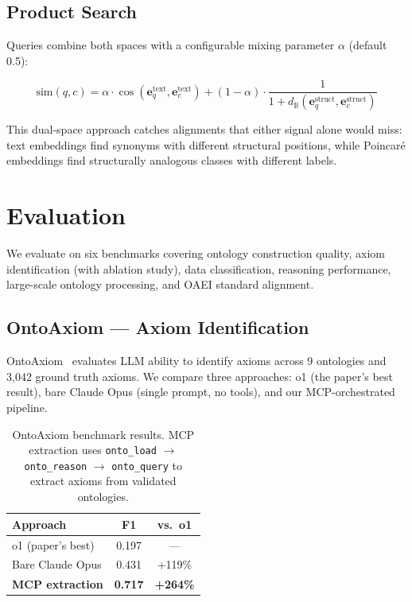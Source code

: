 \documentclass[runningheads]{llncs}
\begin{document}
\subsection{Product Search}

Queries combine both spaces with a configurable mixing parameter $\alpha$ (default 0.5):

\begin{equation}
\text{sim}(q, c) = \alpha \cdot \cos(\mathbf{e}_q^{\text{text}}, \mathbf{e}_c^{\text{text}}) + (1 - \alpha) \cdot \frac{1}{1 + d_{\mathbb{B}}(\mathbf{e}_q^{\text{struct}}, \mathbf{e}_c^{\text{struct}})}
\label{eq:product}
\end{equation}

This dual-space approach catches alignments that either signal alone would miss: text embeddings find synonyms with different structural positions, while Poincar\'e embeddings find structurally analogous classes with different labels.


\section{Evaluation}
\label{sec:eval}

We evaluate on six benchmarks covering ontology construction quality, axiom identification (with ablation study), data classification, reasoning performance, large-scale ontology processing, and OAEI standard alignment.

\subsection{OntoAxiom — Axiom Identification}

OntoAxiom~\cite{ontoaxiom} evaluates LLM ability to identify axioms across 9 ontologies and 3{,}042 ground truth axioms. We compare three approaches: o1 (the paper's best result), bare Claude Opus (single prompt, no tools), and our MCP-orchestrated pipeline.

\begin{table}[t]
\centering
\caption{OntoAxiom benchmark results. MCP extraction uses \texttt{onto\_load} $\to$ \texttt{onto\_reason} $\to$ \texttt{onto\_query} to extract axioms from validated ontologies.}
\label{tab:ontoaxiom}
\begin{tabular}{@{}lcc@{}}
\toprule
\textbf{Approach} & \textbf{F1} & \textbf{vs.\ o1} \\
\midrule
o1 (paper's best) & 0.197 & --- \\
Bare Claude Opus & 0.431 & +119\% \\
\textbf{MCP extraction} & \textbf{0.717} & \textbf{+264\%} \\
\bottomrule
\end{tabular}
\end{table}
\end{document}
